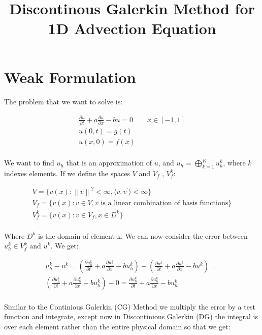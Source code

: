 \documentclass{article}
\newcommand{\norm}[1]{\left\lVert#1\right\rVert}
\begin{document}
\setlength\arraycolsep{2pt}
\title{Discontinous Galerkin Method for 1D Advection Equation}
\author{}
\maketitle


\section{Weak Formulation}
  
\noindent The problem that we want to solve is:

\begin{gather*}
  \frac{\partial u}{\partial t} + a \frac{\partial u}{\partial x} - bu = 0 \qquad x \in [-1, 1] \\
  u(0, t) = g(t) \\
  u(x, 0) = f(x) \\
\end{gather*}

\noindent We want to find $u_h$ that is an approximation of $u$, and $u_h = \bigoplus_{k=1}^K u_h^k$, where $k$ indexes elements. If we define the spaces $V$ and $V_f$ , $V_f^k$:

\begin{gather*}
  V = \{ v(x) : \norm{v}^2 < \infty, \langle v, v^{\prime}\rangle < \infty\} \\
  V_f = \{ v(x) : v \in V, v \text{ is a linear combination of basis functions}\} \\
  V_f^k = \{ v(x) : v \in V_f, x \in D^k\}\\
\end{gather*}

\noindent Where $D^k$ is the domain of element k.  We can now consider the error between  $u_h^k \in V_f^k$ and $u^k$. We get:

\begin{gather*}
  u_h^k - u^k = \left(\frac{\partial u_h^k}{\partial t} + a \frac{\partial u_h^k}{\partial x} - bu_h^k\right) - \left(\frac{\partial u^k}{\partial t} + a \frac{\partial u^k}{\partial x} - bu^k\right) = \\
  \left(\frac{\partial u_h^k}{\partial t} + a \frac{\partial u_h^k}{\partial x} - bu_h^k\right) - 0 = \frac{\partial u_h^k}{\partial t} + a \frac{\partial u_h^k}{\partial x} - bu_h^k \\
\end{gather*}

\noindent Similar to the Continious Galerkin (CG) Method we multiply the error by a test function and integrate, except now in Discontinious Galerkin (DG) the integral is over each element rather than the entire physical domain so that we get:
\end{document}
